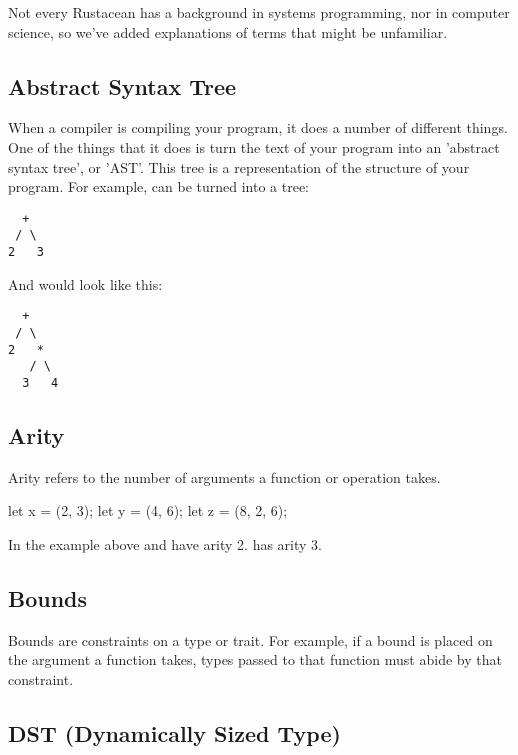 Not every Rustacean has a background in systems programming, nor in computer science, so we've added explanations of terms that might be 
unfamiliar.

\subsection*{Abstract Syntax Tree}
\label{sec:gloss_syntaxtree}

When a compiler is compiling your program, it does a number of different things. One of the things that it does is turn 
the text of your program into an 'abstract syntax tree', or 'AST'. This tree is a representation of the structure of your 
program. For example,  can be turned into a tree:

\begin{verbatim}
  +
 / \
2   3
\end{verbatim}

And  would look like this:

\begin{verbatim}
  +
 / \
2   *
   / \
  3   4
\end{verbatim}

\subsection*{Arity}
\label{sec:gloss_arity}

Arity refers to the number of arguments a function or operation takes.

\begin{rustc}
let x = (2, 3);
let y = (4, 6);
let z = (8, 2, 6);
\end{rustc}

In the example above  and  have arity 2.  has arity 3.

\subsection*{Bounds}
\label{sec:gloss_bounds}

Bounds are constraints on a type or trait. For example, if a bound is placed on the argument a function takes, 
types passed to that function must abide by that constraint.

\subsection*{DST (Dynamically Sized Type)}
\label{sec:gloss_dst}

